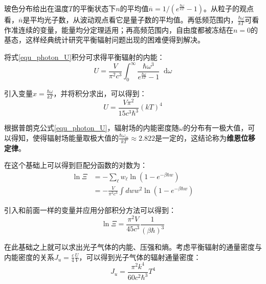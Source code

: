 \documentclass[UTF8]{ctexart}
\newcommand*{\dif}{\mathop{}\!\mathrm{d}}
\begin{document}
	玻色分布给出在温度$ T $的平衡状态下$ n $的平均值$ \overline{n}=1/\left(e^{\frac{\hbar \omega}{k T}}-1\right) $。从粒子的观点看，$ \overline{n} $是平均光子数，从波动观点看它是量子数的平均值。再低频范围内，$ \frac{\hbar \omega}{k T} $可看作准连续的变量，能量均分定理适用；再高频范围内，自由度都被冻结在$ n=0 $的基态，这样经典统计研究平衡辐射问题出现的困难便得到解决。
	
	将式\ref{equ_photon_U}积分可求得平衡辐射的内能：
	\begin{equation}
		U=\frac{V}{\pi^{2} c^{3}} \int_{0}^{\infty} \frac{\hbar \omega^{3}}{e^{\frac{\hbar \omega}{k T}}-1} \dif \omega
	\end{equation}
	
\noindent 引入变量$ x=\frac{\hbar \omega}{k T} $，并将积分求出，可以得到：
\begin{equation}
	U =\frac{V \pi^{2}}{15 c^{3} \hbar^{3}}\left(k T\right)^{4}
\end{equation}

	根据普朗克公式\ref{equ_photon_U}，辐射场的内能密度随$ \omega $的分布有一极大值，可以得知，使得辐射场能量取极大值的$ \frac{\hbar \omega_{m}}{k T} \approx 2.822 $是一定的，这结论称为\textbf{维恩位移定律}。
	
	在这个基础上可以得到巨配分函数的对数为：
	\begin{equation}
		\begin{aligned}
		\ln \Xi &=-\sum_{\ell} w_{\ell} \ln \left(1-e^{-\beta \hbar w}\right)\\
		&=-\frac{V}{\pi^{2} c^{3}} \int d w w^{2} \ln \left(1-e^{-\beta \hbar w}\right)
		\end{aligned}
	\end{equation}
	
	引入和前面一样的变量并应用分部积分方法可以得到：
	\begin{equation}
		\ln \Xi =\frac{\pi^{2} V}{45 c^{3}} \frac{1}{(\beta \hbar)^{3}}
	\end{equation}
	
	在此基础之上就可以求出光子气体的内能、压强和熵。考虑平衡辐射的通量密度与内能密度的关系$ J_{u}=\frac{c}{4} \frac{U}{V} $，可以得到光子气体的辐射通量密度：
	\begin{equation}
		J_{u}=\frac{\pi^{2} k^{4}}{60 c^{2} \hbar^{3}} T^{4}
	\end{equation}
	
\end{document}
